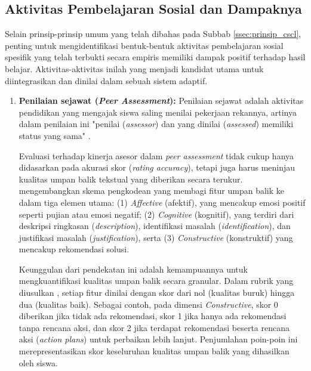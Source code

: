 \subsection{Aktivitas Pembelajaran Sosial dan Dampaknya}
\label{ssec:aktivitas_pembelajaran_sosial}
Selain prinsip-prinsip umum yang telah dibahas pada Subbab
\ref{ssec:prinsip_cscl}, penting untuk mengidentifikasi bentuk-bentuk aktivitas
pembelajaran sosial spesifik yang telah terbukti secara empiris memiliki dampak
positif terhadap hasil belajar. Aktivitas-aktivitas inilah yang menjadi kandidat
utama untuk diintegrasikan dan dinilai dalam sebuah sistem adaptif.

\begin{enumerate}
    \item \textbf{Penilaian sejawat (\textit{Peer Assessment}):}
    Penilaian sejawat adalah aktivitas pendidikan yang mengajak
    siswa saling menilai pekerjaan rekannya, artinya dalam
    penilaian ini "penilai (\textit{assessor}) dan yang dinilai
    (\textit{assessed}) memiliki status yang sama"
    \autocite{Ihichr2024}.
    
    Evaluasi terhadap kinerja asesor dalam
    \textit{peer assessment} tidak cukup hanya didasarkan
    pada akurasi skor (\textit{rating accuracy}), tetapi
    juga harus meninjau kualitas umpan balik tekstual yang
    diberikan secara terukur. \textcite{Kerman2024}
    mengembangkan skema pengkodean yang membagi fitur umpan
    balik ke dalam tiga elemen utama: (1) \textit{Affective}
    (afektif), yang mencakup emosi positif seperti pujian
    atau emosi negatif; (2) \textit{Cognitive} (kognitif),
    yang terdiri dari deskripsi ringkasan (\textit{description}),
    identifikasi masalah (\textit{identification}), dan
    justifikasi masalah (\textit{justification}),
    serta (3) \textit{Constructive} (konstruktif)
    yang mencakup rekomendasi solusi.
    
    Keunggulan dari pendekatan ini adalah kemampuannya
    untuk mengkuantifikasi kualitas umpan balik secara
    granular. Dalam rubrik yang diusulkan
    \textcite{Kerman2024}, setiap fitur dinilai dengan
    skor dari nol (kualitas buruk) hingga dua (kualitas baik).
    Sebagai contoh, pada dimensi \textit{Constructive},
    skor 0 diberikan jika tidak ada rekomendasi, skor 1 jika
    hanya ada rekomendasi tanpa rencana aksi, dan skor 2 jika
    terdapat rekomendasi beserta rencana aksi (\textit{action
    plans}) untuk perbaikan lebih lanjut. Penjumlahan poin-poin
    ini merepresentasikan skor keseluruhan kualitas umpan
    balik yang dihasilkan oleh siswa.
    

\end{enumerate}
